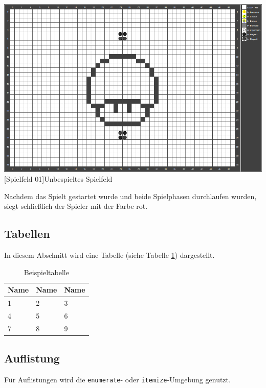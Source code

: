 \documentclass[12pt,a4paper,bibliography=totocnumbered,listof=totocnumbered]{scrartcl}
\begin{document}
\vspace{1em}
\begin{minipage}{\linewidth}
	\centering
	\includegraphics[width=0.5\linewidth]{pics/gamefield01.png}
	[Spielfeld 01]{Unbespieltes Spielfeld\footnotemark }
	\label{fig:reversi01}
\end{minipage}

Nachdem das Spielt gestartet wurde und beide Spielphasen durchlaufen wurden, siegt schließlich der Spieler mit der Farbe rot.


\subsection{Tabellen}
In diesem Abschnitt wird eine Tabelle (siehe Tabelle \ref{tab:beispiel}) dargestellt.

\vspace{1em}
\begin{table}[!h]
	\centering
	\begin{tabular}{|l|l|l|}
		\hline
		\textbf{Name} & \textbf{Name} & \textbf{Name}\\
		\hline
		1 & 2 & 3\\
		\hline
		4 & 5 & 6\\
		\hline
		7 & 8 & 9\\
		\hline
	\end{tabular}
	\caption{Beispieltabelle}
	\label{tab:beispiel}
\end{table}


\subsection{Auflistung}
Für Auflistungen wird die \texttt{enumerate}- oder \texttt{itemize}-Umgebung genutzt.
\end{document}
